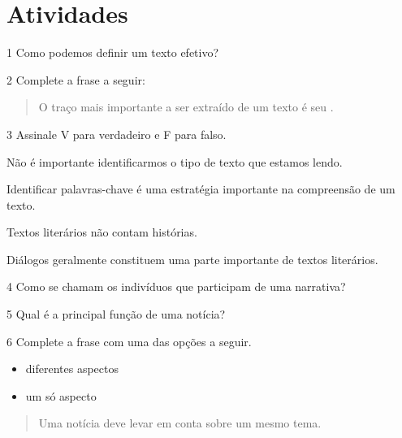 \section*{Atividades}

\num{1} Como podemos definir um texto efetivo?



\num{2} Complete a frase a seguir:

\begin{quote}
O traço mais importante a ser extraído de um texto é seu .
\end{quote}


\num{3} Assinale V para verdadeiro e F para falso.

\begin{boxlist}
 Não é importante identificarmos o tipo de texto que estamos lendo. 

 Identificar palavras-chave é uma estratégia importante na compreensão de um texto. 

 Textos literários não contam histórias. 

 Diálogos geralmente constituem uma parte importante de textos literários. 
\end{boxlist}

\num{4} Como se chamam os indivíduos que participam de uma narrativa?



\num{5} Qual é a principal função de uma notícia?



\num{6} Complete a frase com uma das opções a seguir.

\begin{itemize}
	\item diferentes aspectos
	\item um só aspecto
\end{itemize}

\begin{quote}
Uma notícia deve levar em conta  sobre um mesmo tema.
\end{quote}

